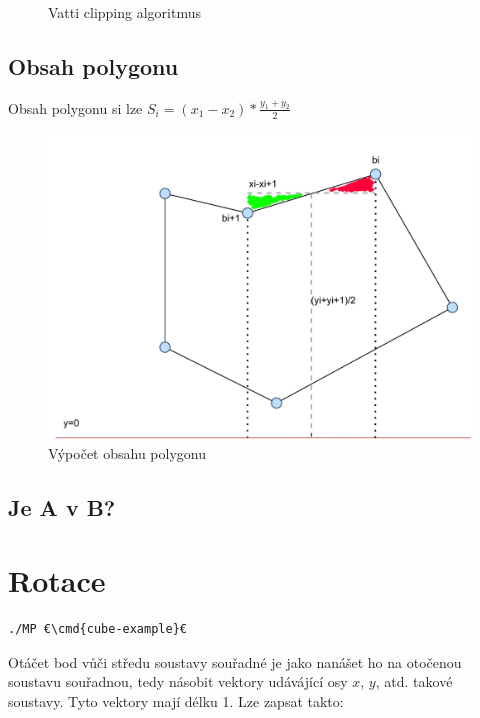 \documentclass[a4paper,12pt]{book}
\newcommand{\cmd}[1]{\textcolor{blue}{\textbf{#1}}}
\begin{document}
\begin{figure}[H]
  \centering
  
  \caption{Vatti clipping algoritmus}
\end{figure}



\section{Obsah polygonu}

Obsah polygonu si lze
$S_i = (x_1-x_2)*\frac{y_1+y_2}{2}$

\begin{figure}[H]
  \centering
  \includegraphics[width=1\textwidth]{fig8.png}
  \caption{Výpočet obsahu polygonu}
\end{figure}


\section{Je A v B?}




\chapter{Rotace}

\begin{lstlisting}
./MP €\cmd{cube-example}€ 
\end{lstlisting}

Otáčet bod vůči středu soustavy souřadné je jako nanášet ho na otočenou soustavu souřadnou, tedy násobit vektory udávájící osy $x$, $y$, atd. takové soustavy.
Tyto vektory mají délku 1. Lze zapsat takto:
\end{document}
